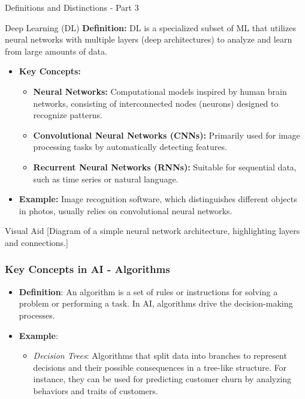 \documentclass[aspectratio=169]{beamer}
\begin{document}
\begin{frame}[fragile]{Definitions and Distinctions - Part 3}
    \begin{block}{Deep Learning (DL)}
        \textbf{Definition:} DL is a specialized subset of ML that utilizes neural networks with multiple layers (deep architectures) to analyze and learn from large amounts of data.
    \end{block}

    \begin{itemize}
        \item \textbf{Key Concepts:}
        \begin{itemize}
            \item \textbf{Neural Networks:} Computational models inspired by human brain networks, consisting of interconnected nodes (neurons) designed to recognize patterns.
            \item \textbf{Convolutional Neural Networks (CNNs):} Primarily used for image processing tasks by automatically detecting features.
            \item \textbf{Recurrent Neural Networks (RNNs):} Suitable for sequential data, such as time series or natural language.
        \end{itemize}

        \item \textbf{Example:} Image recognition software, which distinguishes different objects in photos, usually relies on convolutional neural networks.
    \end{itemize}

    \begin{block}{Visual Aid}
        [Diagram of a simple neural network architecture, highlighting layers and connections.]
    \end{block}
\end{frame}

\begin{frame}[fragile]
    \frametitle{Key Concepts in AI - Algorithms}
    \begin{itemize}
        \item \textbf{Definition}: An algorithm is a set of rules or instructions for solving a problem or performing a task. In AI, algorithms drive the decision-making processes.
        \item \textbf{Example}: 
        \begin{itemize}
            \item \textit{Decision Trees}: Algorithms that split data into branches to represent decisions and their possible consequences in a tree-like structure. For instance, they can be used for predicting customer churn by analyzing behaviors and traits of customers.
        \end{itemize}
    \end{itemize}
\end{frame}
\end{document}
